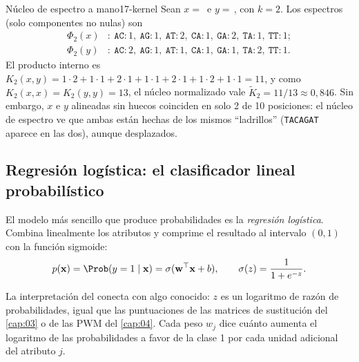 \begin{ejemplo}{Núcleo de espectro a mano}{17-kernel}
Sean $x=$\, e $y=$\,, con $k=2$. Los espectros (solo componentes no nulas) son
\begin{align*}
\Phi_2(x)&\!:\ \texttt{AC}{:}1,\ \texttt{AG}{:}1,\ \texttt{AT}{:}2,\ \texttt{CA}{:}1,\ \texttt{GA}{:}2,\ \texttt{TA}{:}1,\ \texttt{TT}{:}1;\\
\Phi_2(y)&\!:\ \texttt{AC}{:}2,\ \texttt{AG}{:}1,\ \texttt{AT}{:}1,\ \texttt{CA}{:}1,\ \texttt{GA}{:}1,\ \texttt{TA}{:}2,\ \texttt{TT}{:}1.
\end{align*}
El producto interno es $K_2(x,y)=1\cdot2+1\cdot1+2\cdot1+1\cdot1+2\cdot1+1\cdot2+1\cdot1=11$, y como $K_2(x,x)=K_2(y,y)=13$, el núcleo normalizado vale $\tilde K_2 = 11/13 \approx 0{,}846$. Sin embargo, $x$ e $y$ alineadas sin huecos coinciden en solo 2 de 10 posiciones: el núcleo de espectro ve que ambas están hechas de los mismos ``ladrillos'' (\texttt{TACAGAT} aparece en las dos), aunque desplazados.
\end{ejemplo}

\subsection{Regresión logística: el clasificador lineal probabilístico}

El modelo más sencillo que produce probabilidades es la \emph{regresión logística}. Combina linealmente los atributos y comprime el resultado al intervalo $(0,1)$ con la función sigmoide:
\begin{equation}\label{eq:17-logistica}
p(\mathbf{x}) = \Prob(y=1\mid\mathbf{x}) = \sigma(\mathbf{w}^{\top}\mathbf{x}+b),\qquad \sigma(z)=\frac{1}{1+e^{-z}}.
\end{equation}

\begin{simbolos}
\end{simbolos}

La interpretación del  conecta con algo conocido: $z$ es un logaritmo de razón de probabilidades, igual que las puntuaciones de las matrices de sustitución del \cref{cap:03} o de las PWM del \cref{cap:04}. Cada peso $w_j$ dice cuánto aumenta el logaritmo de las probabilidades a favor de la clase 1 por cada unidad adicional del atributo $j$.

